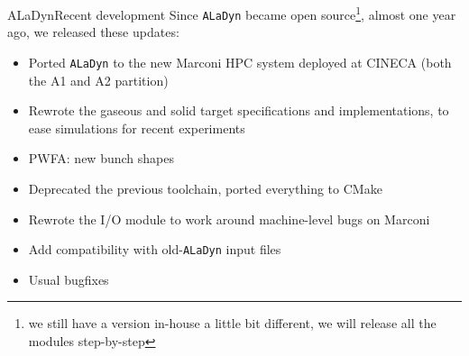 \documentclass[final]{beamer}
\def\aladyn{\texttt{ALaDyn} }
\begin{document}
\begin{frame}{ALaDyn}{Recent development}
Since \aladyn became open source\footnote{we still have a version in-house a little bit different, we will release all the modules step-by-step}, almost one year ago, we released these updates:
\begin{itemize}
\item Ported \aladyn to the new Marconi HPC system deployed at CINECA (both the A1 and A2 partition)
\item Rewrote the gaseous and solid target specifications and implementations, to ease simulations for recent experiments
\item PWFA: new bunch shapes
\item Deprecated the previous toolchain, ported everything to CMake
\item Rewrote the I/O module to work around machine-level bugs on Marconi
\item Add compatibility with old-\aladyn input files
\item Usual bugfixes
\end{itemize}

\end{frame}
\end{document}
